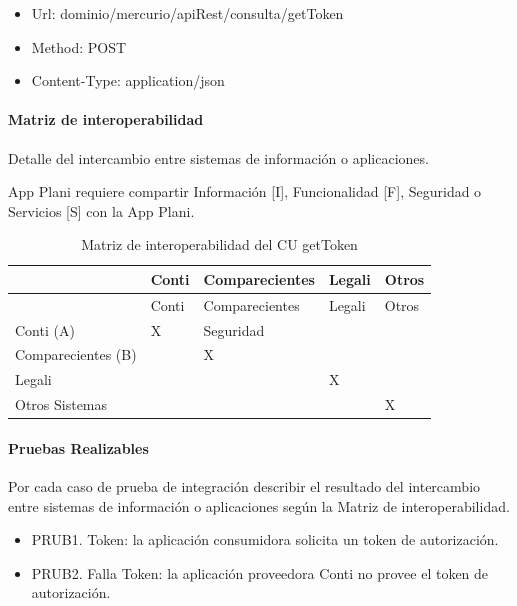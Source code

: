 \documentclass[
  paper=a4,
  ,captions=tableheading
]{scrartcl}
\providecommand{\tightlist}{%
  \setlength{\itemsep}{0pt}\setlength{\parskip}{0pt}}
\begin{document}
\begin{itemize}
\tightlist
\item
  Url: dominio/mercurio/apiRest/consulta/getToken
\item
  Method: POST
\item
  Content-Type: application/json
\end{itemize}

\paragraph{Matriz de
interoperabilidad}\label{sec:matriz-de-interoperabilidad}

Detalle del intercambio entre sistemas de información o aplicaciones.

App Plani requiere compartir Información {[}I{]}, Funcionalidad {[}F{]},
Seguridad o Servicios {[}S{]} con la App Plani.

\begin{longtable}[]{@{}lllll@{}}
\caption{Matriz de interoperabilidad del CU getToken}\tabularnewline
\toprule\noalign{}
& Conti & Comparecientes & Legali & Otros \\
\midrule\noalign{}
\endfirsthead
\toprule\noalign{}
& Conti & Comparecientes & Legali & Otros \\
\midrule\noalign{}
\endhead
\bottomrule\noalign{}
\endlastfoot
Conti (A) & X & Seguridad & & \\
Comparecientes (B) & & X & & \\
Legali & & & X & \\
Otros Sistemas & & & & X \\
\end{longtable}

\paragraph{Pruebas Realizables}\label{sec:pruebas-realizables}

Por cada caso de prueba de integración describir el resultado del
intercambio entre sistemas de información o aplicaciones según la Matriz
de interoperabilidad.

\begin{itemize}
\tightlist
\item
  PRUB1. Token: la aplicación consumidora solicita un token de
  autorización.
\item
  PRUB2. Falla Token: la aplicación proveedora Conti no provee el token
  de autorización.
\end{itemize}
\end{document}

